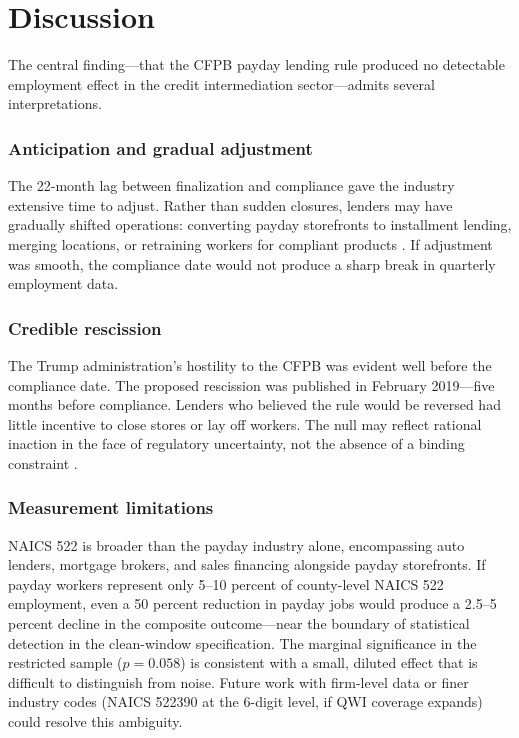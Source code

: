 \documentclass[12pt]{article}
\begin{document}
\section{Discussion}

The central finding---that the CFPB payday lending rule produced no detectable employment effect in the credit intermediation sector---admits several interpretations.

\subsubsection*{Anticipation and gradual adjustment} The 22-month lag between finalization and compliance gave the industry extensive time to adjust. Rather than sudden closures, lenders may have gradually shifted operations: converting payday storefronts to installment lending, merging locations, or retraining workers for compliant products \citep{stegman2007}. If adjustment was smooth, the compliance date would not produce a sharp break in quarterly employment data.

\subsubsection*{Credible rescission} The Trump administration's hostility to the CFPB was evident well before the compliance date. The proposed rescission was published in February 2019---five months before compliance. Lenders who believed the rule would be reversed had little incentive to close stores or lay off workers. The null may reflect rational inaction in the face of regulatory uncertainty, not the absence of a binding constraint \citep{jackson2014}.

\subsubsection*{Measurement limitations} NAICS 522 is broader than the payday industry alone, encompassing auto lenders, mortgage brokers, and sales financing alongside payday storefronts. If payday workers represent only 5--10 percent of county-level NAICS 522 employment, even a 50 percent reduction in payday jobs would produce a 2.5--5 percent decline in the composite outcome---near the boundary of statistical detection in the clean-window specification. The marginal significance in the restricted sample ($p = 0.058$) is consistent with a small, diluted effect that is difficult to distinguish from noise. Future work with firm-level data or finer industry codes (NAICS 522390 at the 6-digit level, if QWI coverage expands) could resolve this ambiguity.
\end{document}
